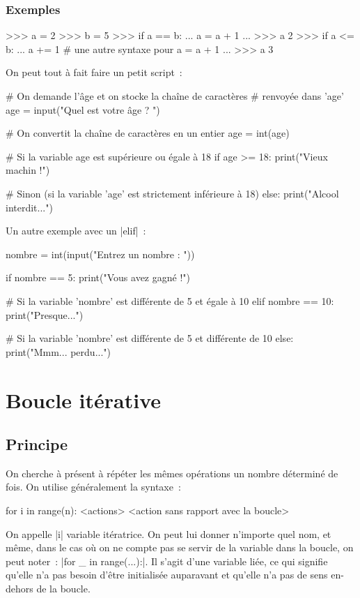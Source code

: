 		\subsubsection{Exemples}
		\begin{pythoncode}
			>>> a = 2
			>>> b = 5
			>>> if a == b:
			...     a = a + 1
			...
			>>> a
			2
			>>> if a <= b:
			...     a += 1 # une autre syntaxe pour a = a + 1
			...
			>>> a
			3
		\end{pythoncode}
		
		On peut tout à fait faire un petit script~:
		
		\begin{pythoncode}
			# On demande l'âge et on stocke la chaîne de caractères
			# renvoyée dans 'age'
			age = input("Quel est votre âge ? ")
			
			# On convertit la chaîne de caractères en un entier
			age = int(age)
			
			# Si la variable age est supérieure ou égale à 18
			if age >= 18:
				print("Vieux machin !")
			
			# Sinon (si la variable 'age' est strictement inférieure à 18)
			else:
				print("Alcool interdit...")
		\end{pythoncode}
		
		Un autre exemple avec un \python|elif|~:
		
		\begin{pythoncode}
			nombre = int(input("Entrez un nombre : "))
			
			if nombre == 5:
				print("Vous avez gagné !")
			
			# Si la variable 'nombre' est différente de 5 et égale à 10
			elif nombre == 10:
				print("Presque...")
				
			# Si la variable 'nombre' est différente de 5 et différente de 10
			else:
				print("Mmm... perdu...")
		\end{pythoncode}
		
\section{Boucle itérative} \label{for}
	
	\subsection{Principe}
		
		On cherche à présent à répéter les mêmes opérations un nombre déterminé de fois.
		On utilise généralement la syntaxe~:
		\begin{pythoncode}
			for i in range(n):
				<actions>
			<action sans rapport avec la boucle>
		\end{pythoncode}
		On appelle \python|i| variable itératrice. On peut lui donner n'importe quel nom, et même, dans le cas où on ne compte pas se servir de la variable dans la boucle, on peut noter~: \python|for _ in range(...):|. Il s'agit d'une variable liée, ce qui signifie qu'elle n'a pas besoin d'être initialisée auparavant et qu'elle n'a pas de sens en-dehors de la boucle.
		
